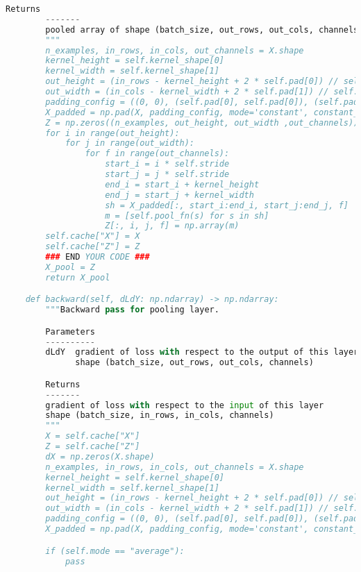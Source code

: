 \begin{lstlisting}[language=Python]
        Returns
        -------
        pooled array of shape (batch_size, out_rows, out_cols, channels)
        """
        n_examples, in_rows, in_cols, out_channels = X.shape
        kernel_height = self.kernel_shape[0]
        kernel_width = self.kernel_shape[1]
        out_height = (in_rows - kernel_height + 2 * self.pad[0]) // self.stride + 1
        out_width = (in_cols - kernel_width + 2 * self.pad[1]) // self.stride + 1
        padding_config = ((0, 0), (self.pad[0], self.pad[0]), (self.pad[1], self.pad[1]), (0, 0))
        X_padded = np.pad(X, padding_config, mode='constant', constant_values=0)
        Z = np.zeros((n_examples, out_height, out_width ,out_channels))
        for i in range(out_height):
            for j in range(out_width):
                for f in range(out_channels):
                    start_i = i * self.stride
                    start_j = j * self.stride                   
                    end_i = start_i + kernel_height
                    end_j = start_j + kernel_width
                    sh = X_padded[:, start_i:end_i, start_j:end_j, f]
                    m = [self.pool_fn(s) for s in sh]                   
                    Z[:, i, j, f] = np.array(m)                
        self.cache["X"] = X
        self.cache["Z"] = Z
        ### END YOUR CODE ###
        X_pool = Z
        return X_pool

    def backward(self, dLdY: np.ndarray) -> np.ndarray:
        """Backward pass for pooling layer.

        Parameters
        ----------
        dLdY  gradient of loss with respect to the output of this layer
              shape (batch_size, out_rows, out_cols, channels)

        Returns
        -------
        gradient of loss with respect to the input of this layer
        shape (batch_size, in_rows, in_cols, channels)
        """
        X = self.cache["X"]
        Z = self.cache["Z"]
        dX = np.zeros(X.shape)
        n_examples, in_rows, in_cols, out_channels = X.shape
        kernel_height = self.kernel_shape[0]
        kernel_width = self.kernel_shape[1]
        out_height = (in_rows - kernel_height + 2 * self.pad[0]) // self.stride + 1
        out_width = (in_cols - kernel_width + 2 * self.pad[1]) // self.stride + 1
        padding_config = ((0, 0), (self.pad[0], self.pad[0]), (self.pad[1], self.pad[1]), (0, 0))
        X_padded = np.pad(X, padding_config, mode='constant', constant_values=0)

        if (self.mode == "average"):
            pass


\end{lstlisting}
